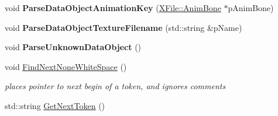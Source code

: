 \begin{DoxyCompactItemize}
\item 
\hypertarget{class_assimp_1_1_x_file_parser_a9b2fed53ffb870ec5cd91dd7f56d72c2}{void {\bfseries Parse\+Data\+Object\+Animation\+Key} (\hyperlink{struct_assimp_1_1_x_file_1_1_anim_bone}{X\+File\+::\+Anim\+Bone} $\ast$p\+Anim\+Bone)}\label{class_assimp_1_1_x_file_parser_a9b2fed53ffb870ec5cd91dd7f56d72c2}

\item 
\hypertarget{class_assimp_1_1_x_file_parser_a18e3cc486144b6e1deb90a8aaa772745}{void {\bfseries Parse\+Data\+Object\+Texture\+Filename} (std\+::string \&p\+Name)}\label{class_assimp_1_1_x_file_parser_a18e3cc486144b6e1deb90a8aaa772745}

\item 
\hypertarget{class_assimp_1_1_x_file_parser_aaa54d94ead30f07364e872797569565c}{void {\bfseries Parse\+Unknown\+Data\+Object} ()}\label{class_assimp_1_1_x_file_parser_aaa54d94ead30f07364e872797569565c}

\item 
\hypertarget{class_assimp_1_1_x_file_parser_a58b0af77b15ab9ab62b6e57d15b55a21}{void \hyperlink{class_assimp_1_1_x_file_parser_a58b0af77b15ab9ab62b6e57d15b55a21}{Find\+Next\+None\+White\+Space} ()}\label{class_assimp_1_1_x_file_parser_a58b0af77b15ab9ab62b6e57d15b55a21}

\begin{DoxyCompactList}\small\item\em places pointer to next begin of a token, and ignores comments \end{DoxyCompactList}\item 
\hypertarget{class_assimp_1_1_x_file_parser_aaab454251408ef75977f461c8741b0d2}{std\+::string \hyperlink{class_assimp_1_1_x_file_parser_aaab454251408ef75977f461c8741b0d2}{Get\+Next\+Token} ()}\label{class_assimp_1_1_x_file_parser_aaab454251408ef75977f461c8741b0d2}


\end{DoxyCompactItemize}

